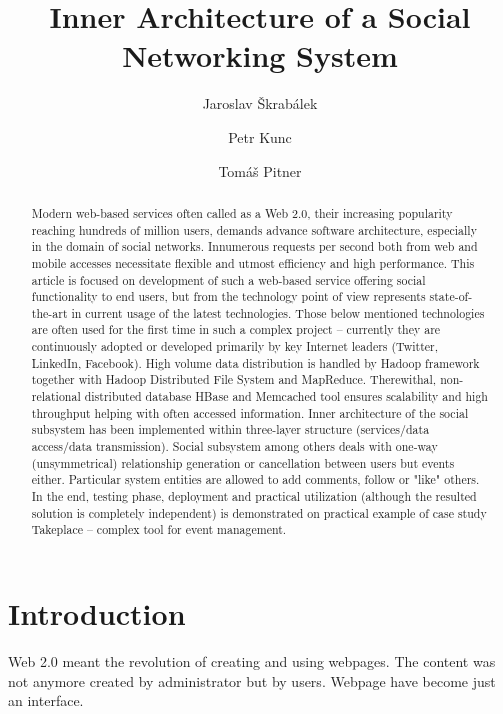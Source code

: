\documentclass{llncs}
\begin{document}
\title{Inner Architecture of a Social Networking System}
\author{Jaroslav \v{S}krab\'{a}lek \and Petr Kunc \and Tom\'{a}\v{s} Pitner}

\maketitle

\begin{abstract}
  Modern web-based services often called as a Web 2.0, their increasing
  popularity reaching hundreds of million users, demands advance software
  architecture, especially in the domain of social networks. Innumerous
  requests per second both from web and mobile accesses necessitate flexible
  and utmost efficiency and high performance. This article is focused on
  development of such a web-based service offering social functionality to end
  users, but from the technology point of view represents state-of-the-art in
  current usage of the latest technologies. Those below mentioned technologies
  are often used for the first time in such a complex project – currently they
  are continuously adopted or developed primarily by key Internet leaders
  (Twitter, LinkedIn, Facebook). High volume data distribution is handled by
  Hadoop framework together with Hadoop Distributed File System and MapReduce.
  Therewithal, non-relational distributed database HBase and Memcached tool
  ensures scalability and high throughput helping with often accessed
  information. Inner architecture of the social subsystem has been implemented
  within three-layer structure (services/data access/data transmission).
  Social subsystem among others deals with one-way (unsymmetrical)
  relationship generation or cancellation between users but events either.
  Particular system entities are allowed to add comments, follow or "like"
  others. In the end, testing phase, deployment and practical utilization
  (although the resulted solution is completely independent) is demonstrated
  on practical example of case study Takeplace – complex tool for event
  management.
\end{abstract}

\section{Introduction}
Web 2.0 \cite{o2007web} meant the revolution of creating and using webpages.
The content was not anymore created by administrator but by users. Webpage
have become just an interface.
\end{document}
